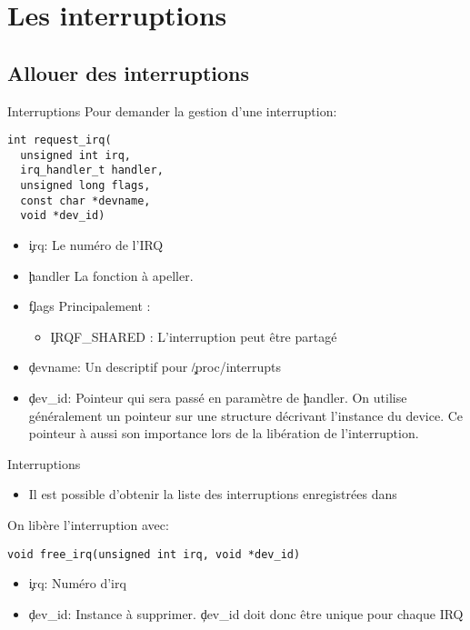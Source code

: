 \section{Les interruptions}

\subsection{Allouer des interruptions}

\begin{frame}[fragile=singleslide]{Interruptions}
  Pour demander la gestion d'une interruption:
  \begin{lstlisting}
int request_irq(
  unsigned int irq,
  irq_handler_t handler,
  unsigned long flags,
  const char *devname,
  void *dev_id)
  \end{lstlisting}
  \begin{itemize}
  \item \c{irq}: Le numéro de l'IRQ
  \item \c{handler} La fonction à apeller.
  \item \c{flags} Principalement :
    \begin{itemize}
    \item \c{IRQF_SHARED} : L'interruption peut être partagé
    \end{itemize}
  \item \c{devname}: Un descriptif pour \c{/proc/interrupts}
  \item  \c{dev_id}:   Pointeur  qui   sera  passé  en   paramètre  de
    \c{handler}. On utilise généralement un pointeur sur une structure
    décrivant l'instance du device. Ce pointeur à aussi son importance
    lors de la libération de l'interruption.
  \end{itemize}
\end{frame}

\begin{frame}[fragile=singleslide]{Interruptions}
  \begin{itemize}
  \item  Il   est  possible  d'obtenir  la   liste  des  interruptions
    enregistrées dans 
  \end{itemize}
  On libère l'interruption avec:
  \begin{lstlisting}
void free_irq(unsigned int irq, void *dev_id)
  \end{lstlisting}
  \begin{itemize}
  \item \c{irq}: Numéro d'irq
  \item \c{dev_id}:  Instance à  supprimer. \c{dev_id} doit  donc être
    unique pour chaque IRQ
  \end{itemize}
\end{frame}

